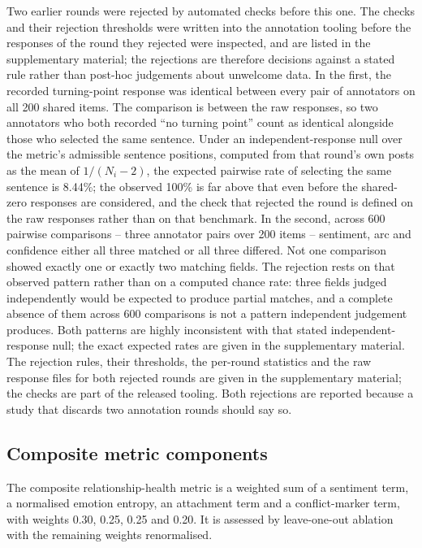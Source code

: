 \documentclass[fleqn,10pt]{wlscirep}
\begin{document}
Two earlier rounds were rejected by automated checks before this one. The checks and their rejection thresholds were written into the annotation tooling before the responses of the round they rejected were inspected, and are listed in the supplementary material; the rejections are therefore decisions against a stated rule rather than post-hoc judgements about unwelcome data. In the first, the recorded turning-point response was identical between every pair of annotators on all 200 shared items. The comparison is between the raw responses, so two annotators who both recorded ``no turning point'' count as identical alongside those who selected the same sentence. Under an independent-response null over the metric's admissible sentence positions, computed from that round's own posts as the mean of $1/(N_i-2)$, the expected pairwise rate of selecting the same sentence is 8.44\%; the observed 100\% is far above that even before the shared-zero responses are considered, and the check that rejected the round is defined on the raw responses rather than on that benchmark. In the second, across 600 pairwise comparisons -- three annotator pairs over 200 items -- sentiment, arc and confidence either all three matched or all three differed. Not one comparison showed exactly one or exactly two matching fields. The rejection rests on that observed pattern rather than on a computed chance rate: three fields judged independently would be expected to produce partial matches, and a complete absence of them across 600 comparisons is not a pattern independent judgement produces. Both patterns are highly inconsistent with that stated independent-response null; the exact expected rates are given in the supplementary material. The rejection rules, their thresholds, the per-round statistics and the raw response files for both rejected rounds are given in the supplementary material; the checks are part of the released tooling. Both rejections are reported because a study that discards two annotation rounds should say so.

\subsection{Composite metric components}\label{subsec:gase}

The composite relationship-health metric is a weighted sum of a sentiment term, a normalised emotion entropy, an attachment term and a conflict-marker term, with weights 0.30, 0.25, 0.25 and 0.20. It is assessed by leave-one-out ablation with the remaining weights renormalised.
\end{document}
